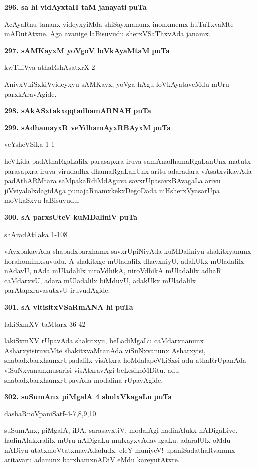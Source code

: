 \noindent
\textbf{296. sa hi vidAyxtaH taM janayati} \hfill {\bf puTa \pageref{91b}}

\smallskip
AcAyaRnu tananx videyxyiMda shiSayxnanunx inonxmemx huTuTxvaMte mADutAtxne. Aga avanige laBisuvudu sherxVSaThxvAda janamx.

\medskip
\textbf{297. sAMKayxM yoVgoV loVkAyaMtaM} \hfill {\bf puTa \pageref{89a}}

\hfill kwTiliVya athaRshAsatxrX 2

\smallskip
AnivxVkiSxkiVvideyxyu sAMKayx, yoVga hAgu loVkAyataveMdu mUru parxkAravAgide.

\medskip
\noindent
\textbf{298. sAkASxtakxqqtadhamARNAH} \hfill {\bf puTa \pageref{106}}

\smallskip
\noindent
\textbf{299. sAdhamayxR veYdhamAyxRBAyxM}  \hfill {\bf puTa \pageref{41c}}

\hfill veYsheVSika 1-1

\smallskip
heVLida padAthaRgaLalilx parasapxra iruva samAnadhamaRgaLanUnx matutx parasapxra iruva virudadhx dhamaRgaLanUnx aritu adaradara vAsatxvikavAda-padAthARMtara saMpakaRdiMdAguva savxrUpasavxBAvagaLa arivu jiVviyalolxdagidAga punajaRnamxkekxDegoDada niHsherxVyasarUpa moVkaSxvu laBisuvudu.

\medskip
\noindent
\textbf{300. sA parxsUteV kuMDaliniV} \hfill {\bf puTa \pageref{156aa}}

\hfill shAradAtilaka 1-108

\smallskip
vAyxpakavAda shabadxbarxhamx savxrUpiNiyAda kuMDaliniyu shakitxyanunx horahomimxsuvudu. A shakitxge mUladalilx dhavxniyU, adakUkx mUladalilx nAdavU, nAda mUladalilx niroVdhikA, niroVdhikA mUladalilx adhaR caMdarxvU, adara mUladalilx biMduvU, adakUkx mUladalilx parAtapxravasutxvU iruvudAgide.

\medskip
\noindent
\textbf{301. sA vitisitxVSaRmANA hi} \hfill {\bf puTa \pageref{157a}}

\hfill lakiSxmXV taMtarx 36-42

\smallskip
lakiSxmXV rUpavAda shakitxyu, beLadiMgaLu caMdarxnanunx AsharxyisiruvaMte shakitxvaMtanAda viSuNxvanunx Asharxyisi, shabadxbarxhamxrUpadalilx visAtxra hoMdalapeVkiSxsi adu athaRrUpanAda viSuNxvananxnusarisi visAtxravAgi beLesikoMDitu. adu shabadxbarxhamxrUpavAda modalina rUpavAgide.

\medskip
\noindent
\textbf{302. suSumAnx piMgalA 4 sholxVkagaLu} \hfill {\bf puTa \pageref{82}}

\hfill dashaRnoVpaniSatf-4-7,8,9,10

\smallskip
suSumAnx, piMgalA, iDA, sarasavxtiV, modalAgi hadinAlukx nADigaLive. hadinAlakxralilx mUru nADigaLu muKayxvAdavugaLu. adaralUlx oMdu nADiyu utatxmoVtatxmavAdadudx. eleY muniyeV! upaniSadathaRvanunx aritavaru adanunx barxhamxnADiV eMdu kareyutAtxre.

